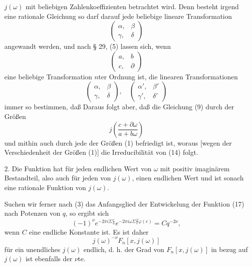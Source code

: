 $j(\omega)$ mit beliebigen Zahlenkoeffizienten betrachtet wird. Denn
besteht irgend eine rationale Gleichung
so darf darauf jede beliebige lineare Transformation
\[
\begin{pmatrix} \alpha, & \beta \\ \gamma, & \delta \end{pmatrix}
\]
angewandt werden, und nach § 29, (5) lassen sich, wenn
\[
\begin{pmatrix} a, & b \\ c, & \partial \end{pmatrix}
\]
eine beliebige Transformation $n$ter Ordnung ist, die linearen
Transformationen
\[
\begin{pmatrix} \alpha, & \beta \\ \gamma, & \delta \end{pmatrix}, \quad
\begin{pmatrix} \alpha', & \beta' \\ \gamma', & \delta' \end{pmatrix}
\]
immer so bestimmen, daß
Daraus folgt aber, daß die Gleichung (9) durch  der
Größen
\[
j\left(\frac{c+\partial\omega}{a+b\omega}\right)
\]
und mithin auch durch jede der Größen (1) befriedigt ist, woraus
[wegen der Verschiedenheit der Größen (1)] die Irreducibilität
von (14) folgt.

2. Die Funktion
hat für jeden endlichen Wert von $\omega$ mit positiv imaginärem Bestandteil, also auch für jeden  von $j(\omega)$, einen endlichen Wert und ist sonach eine  rationale Funktion von $j(\omega)$.

Suchen wir ferner nach (3) das Anfangsglied der Entwickelung
der Funktion (17) nach Potenzen von $q$, so ergibt sich
\[
(-1)^{\nu} e^{-2\pi i \Sigma \frac{c}{a}} e^{-2\pi i \omega \Sigma \frac{\partial}{e}\varphi(e)} = C q^{-2\nu},
\]
wenn $C$ eine endliche Konstante ist. Es ist daher
\[
j(\omega)^{-\nu} F_n[x, j(\omega)]
\]
für ein unendliches $j(\omega)$ endlich, d. h. der Grad von $F_n[x, j(\omega)]$
in bezug auf $j(\omega)$ ist ebenfalls der $\nu$te.
